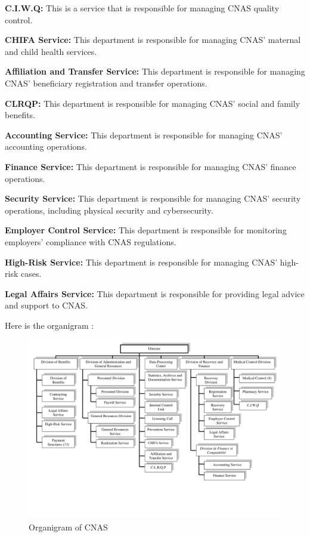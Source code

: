 \textbf{C.I.W.Q:} This is a service that is responsible for managing CNAS quality control.

\textbf{CHIFA Service:} This department is responsible for managing CNAS' maternal and child health services.

\textbf{Affiliation and Transfer Service:} This department is responsible for managing CNAS' beneficiary registration and transfer operations.

\textbf{CLRQP:} This department is responsible for managing CNAS' social and family benefits.

\textbf{Accounting Service:} This department is responsible for managing CNAS' accounting operations.

\textbf{Finance Service:} This department is responsible for managing CNAS' finance operations.

\textbf{Security Service:} This department is responsible for managing CNAS' security operations, including physical security and cybersecurity.

\textbf{Employer Control Service:} This department is responsible for monitoring employers' compliance with CNAS regulations.

\textbf{High-Risk Service:} This department is responsible for managing CNAS' high-risk cases.

\textbf{Legal Affairs Service:} This department is responsible for providing legal advice and support to CNAS.
\medskip

Here is the organigram : 
\begin{figure}[H]
  \centering
  \includegraphics[width=1.0\textwidth]{organigram.png}
  \caption{Organigram of CNAS}
  \label{fig:organigram}
\end{figure}
